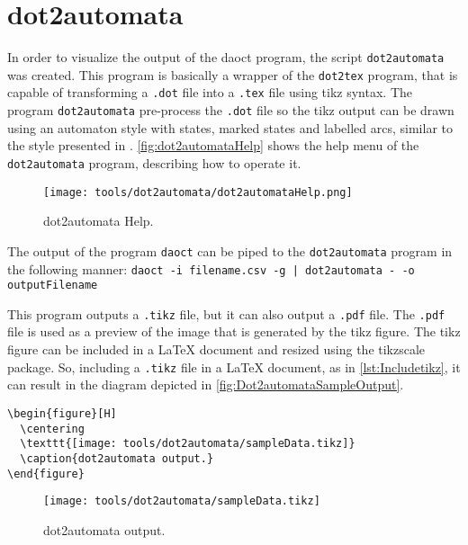 % 

% 

\section{dot2automata}
\label{sec:dot2automata}

In order to visualize the output of the daoct program, the script \verb|dot2automata| was
created. This program is basically a wrapper of the \verb|dot2tex| program, that is capable of
transforming a \verb|.dot| file into a \verb|.tex| file using tikz syntax. The
program \verb|dot2automata|
pre-process the \verb|.dot| file so the tikz output can be drawn using an automaton style
with states, marked states and labelled arcs, similar to the style presented in \cite{moreira2018enhanced}.
\autoref{fig:dot2automataHelp} shows the help menu of the \verb|dot2automata|
program, describing how to operate it. 

\begin{figure}[H]
  \centering
  \texttt{[image: tools/dot2automata/dot2automataHelp.png]}
  \caption{dot2automata Help.}
  \label{fig:dot2automataHelp}
\end{figure}

The output of the program \verb|daoct| can be piped to the \verb|dot2automata|
program in the following manner: \verb]daoct -i filename.csv -g | dot2automata - -o outputFilename]

This program outputs a \verb|.tikz| file, but it can also output a \verb|.pdf| file. The
\verb|.pdf| file is used as a preview
of the image that is generated by the tikz figure. The tikz figure can be
included in a \LaTeX{} document and resized using the
tikzscale package. So, including a \verb|.tikz| file in a \LaTeX{} document, as
in \autoref{lst:Includetikz}, it can
result in the diagram depicted in \autoref{fig:Dot2automataSampleOutput}.

\begin{lstlisting}[caption=Include tikz file.,label={lst:Includetikz},numbers=none]
\begin{figure}[H]
  \centering
  \texttt{[image: tools/dot2automata/sampleData.tikz]}
  \caption{dot2automata output.}
\end{figure}
\end{lstlisting}
\begin{figure}[H]
  \centering
  \texttt{[image: tools/dot2automata/sampleData.tikz]}
  \caption{dot2automata output.}
  \label{fig:Dot2automataSampleOutput}
\end{figure}


